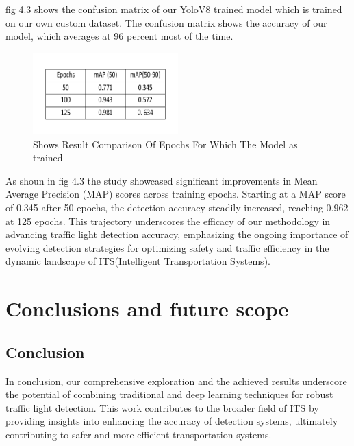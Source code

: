\documentclass[12 pt]{report}
\begin{document}
{{  \hspace*{1cm} fig 4.3 shows the confusion matrix of our YoloV8 trained model which is trained on our own custom dataset. The confusion matrix shows the accuracy of our model, which averages at 96 percent most of the time.

  \begin{figure}[h]
    \centering
    \includegraphics[width=0.5\textwidth]{Comaprison Results.png}
    \caption{Shows Result Comparison Of Epochs For Which The Model as trained}
    \label{fig: YoloV8 implementation}
  \end{figure}

  \hspace*{1cm} As shoun in fig 4.3 the study showcased significant improvements in Mean Average Precision (MAP) scores across training epochs. Starting at a MAP score of 0.345 after 50 epochs, the detection accuracy steadily increased, reaching 0.962 at 125 epochs. This trajectory underscores the efficacy of our methodology in advancing traffic light detection accuracy, emphasizing the ongoing importance of evolving detection strategies for optimizing safety and traffic efficiency in the dynamic landscape of ITS(Intelligent Transportation Systems).
}
}



\newpage
\chapter{Conclusions and future scope}
\section{Conclusion}
{
\hspace*{1cm} In conclusion, our comprehensive exploration and the achieved results underscore the potential of combining traditional and deep learning techniques for robust traffic light detection. This work contributes to the broader field of ITS by providing insights into enhancing the accuracy of detection systems, ultimately contributing to safer and more efficient transportation systems.
}
\end{document}
